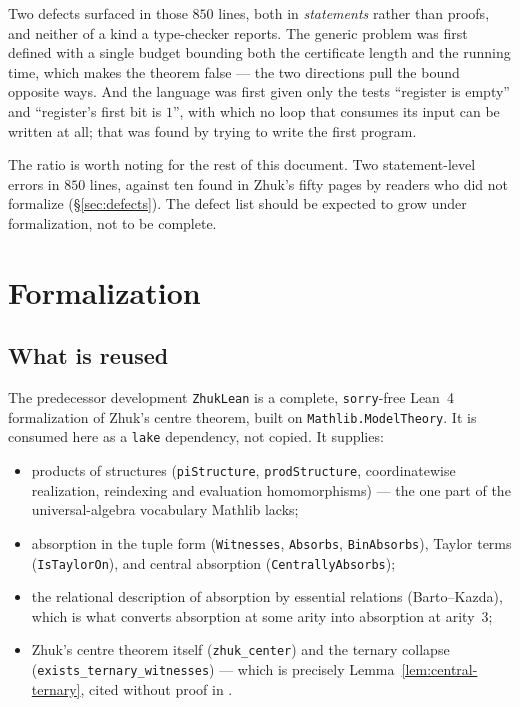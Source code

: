 \begin{remark}
Two defects surfaced in those $850$ lines, both in \emph{statements} rather
than proofs, and neither of a kind a type-checker reports. The generic problem
was first defined with a single budget bounding both the certificate length and
the running time, which makes the theorem false --- the two directions pull the
bound opposite ways. And the language was first given only the tests ``register
is empty'' and ``register's first bit is $1$'', with which no loop that consumes
its input can be written at all; that was found by trying to write the first
program.

The ratio is worth noting for the rest of this document. Two statement-level
errors in $850$ lines, against ten found in Zhuk's fifty pages by readers who
did not formalize (\S\ref{sec:defects}). The defect list should be expected to
grow under formalization, not to be complete.
\end{remark}

\section{Formalization}\label{sec:formalization}

\subsection{What is reused}\label{sec:reuse}

The predecessor development \texttt{ZhukLean} is a complete, \texttt{sorry}-free
Lean~4 formalization of Zhuk's centre theorem, built on
\texttt{Mathlib.ModelTheory}. It is consumed here as a \texttt{lake} dependency,
not copied. It supplies:

\begin{itemize}\tightlist
\item products of structures (\texttt{piStructure}, \texttt{prodStructure},
  coordinatewise realization, reindexing and evaluation homomorphisms) --- the
  one part of the universal-algebra vocabulary Mathlib lacks;
\item absorption in the tuple form (\texttt{Witnesses}, \texttt{Absorbs},
  \texttt{BinAbsorbs}), Taylor terms (\texttt{IsTaylorOn}), and central
  absorption (\texttt{CentrallyAbsorbs});
\item the relational description of absorption by essential relations
  (Barto--Kazda), which is what converts absorption at some arity into
  absorption at arity~$3$;
\item Zhuk's centre theorem itself (\texttt{zhuk\_center}) and the ternary
  collapse (\texttt{exists\_ternary\_witnesses}) --- which is precisely
  Lemma~\ref{lem:central-ternary}, cited without proof in
  \cite{ZhukSimplified}.
\end{itemize}

